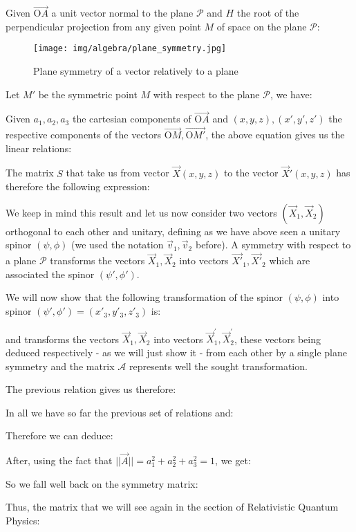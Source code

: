	Given $\overrightarrow{\text{O}A}$ a unit vector normal to the plane $\mathcal{P}$ and $H$  the root of the perpendicular projection from any given point $M$ of space on the plane $\mathcal{P}$:
	
	\begin{figure}[H]
		\centering
		\texttt{[image: img/algebra/plane\_symmetry.jpg]}
		\caption[]{Plane symmetry of a vector relatively to a plane}
	\end{figure}
	Let $M'$ be the symmetric point $M$ with respect to the plane $\mathcal{P}$, we have:
	
	Given $a_1,a_2,a_3$ the cartesian components of $\overrightarrow{\text{O}A}$ and $(x,y,z),(x',y',z')$ the respective components of the vectors $\overrightarrow{\text{O}M},\overrightarrow{\text{O}M'}$, the above equation gives us the linear relations:
	
	The matrix $S$ that take us from vector $\vec{X}(x,y,z)$ to the vector $\vec{X}'(x,y,z)$ has therefore the following expression:
	
	We keep in mind this result and let us now consider two vectors $(\vec{X}_1,\vec{X}_2)$ orthogonal to each other and unitary, defining as we have above  seen a unitary spinor $(\psi,\phi)$ (we used the notation $\vec{v}_1,\vec{v}_2$ before). A symmetry with respect to a plane $\mathcal{P}$ transforms the vectors $\vec{X}_1,\vec{X}_2$ into vectors $\vec{X'}_1,\vec{X'}_2$ which are associated the spinor $(\psi',\phi')$. 
	
	\begin{theorem}
	We will now show that the following transformation of the spinor $(\psi,\phi)$ into spinor $(\psi',\phi')=(x'_3,y'_3,z'_3)$ is:
	
	\end{theorem}
	and transforms the vectors $\vec{X}_1,\vec{X}_2$ into vectors $\vec{X}_1^{'},\vec{X}_2^{'}$, these vectors being deduced respectively - as we will just show it - from each other by a single plane symmetry and the matrix $\mathcal{A}$ represents well the sought transformation.
	
	The previous relation gives us therefore:
	
	In all we have so far the previous set of relations and:
	
	Therefore we can deduce:
	
	After, using the fact that $||\vec{A}||=a_1^2+a_2^2+a_3^2=1$, we get:
	
	So we fall well back on the symmetry matrix:
	
	Thus, the matrix that we will see again in the section of Relativistic Quantum Physics:
	
